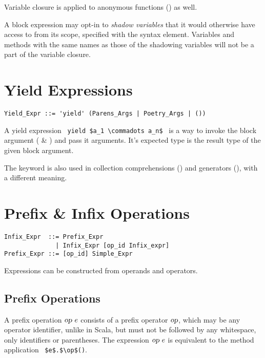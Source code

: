 Variable closure is applied to anonymous functions () as well. 

A block expression may opt-in to {\em shadow variables} that it would otherwise have access to from its scope, specified with the  syntax element. Variables and methods with the same names as those of the shadowing variables will not be a part of the variable closure. 





\section{Yield Expressions}

\syntax\begin{lstlisting}
Yield_Expr ::= 'yield' (Parens_Args | Poetry_Args | ())
\end{lstlisting}

A yield expression ~\lstinline!yield $a_1 \commadots a_n$!~ is a way to invoke the block argument ( \& ) and pass it arguments. It's expected type is the result type of the given block argument. 

The  keyword is also used in collection comprehensions () and generators (), with a different meaning. 





\section{Prefix \& Infix Operations}
\label{sec:prefix-infix-ops}

\syntax\begin{lstlisting}
Infix_Expr  ::= Prefix_Expr
              | Infix_Expr [op_id Infix_expr]
Prefix_Expr ::= [op_id] Simple_Expr
\end{lstlisting}

Expressions can be constructed from operands and operators. 





\subsection{Prefix Operations}

A prefix operation $\mbox{\sl op}\ e$ consists of a prefix operator $\mbox{\sl op}$, which may be any operator identifier, unlike in Scala, but must not be followed by any whitespace, only identifiers or parentheses. The expression $\mbox{\sl op}\ e$ is equivalent to the method application ~\lstinline!$e$.$\op$()!. 





